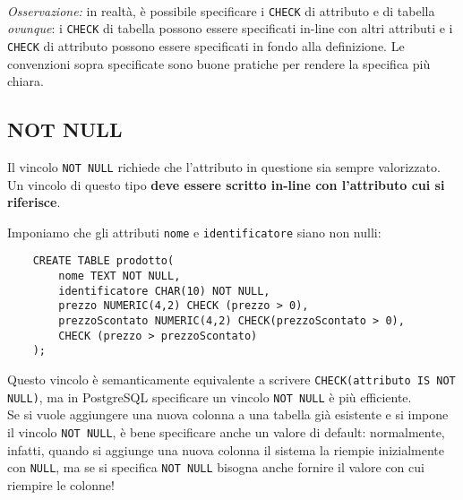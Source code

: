 \documentclass[12pt,a4paper]{book}
\begin{document}
	\paragraph{}\textit{Osservazione:} in realtà, è possibile specificare i \texttt{CHECK} di attributo e di tabella \textit{ovunque}: i \texttt{CHECK} di tabella possono essere specificati in-line con altri attributi e i \texttt{CHECK} di attributo possono essere specificati in fondo alla definizione. Le convenzioni sopra specificate sono buone pratiche per rendere la specifica più chiara.
	\subsection{NOT NULL}
	Il vincolo \texttt{NOT NULL} richiede che l'attributo in questione sia sempre valorizzato.\\Un vincolo di questo tipo \textbf{deve essere scritto in-line con l'attributo cui si riferisce}.
	\begin{tcolorbox}[enhanced jigsaw, breakable, title=Esempio, title filled]
	Imponiamo che gli attributi \texttt{nome} e \texttt{identificatore} siano non nulli:
	\begin{lstlisting}
	CREATE TABLE prodotto(
		nome TEXT NOT NULL,
		identificatore CHAR(10) NOT NULL,
		prezzo NUMERIC(4,2) CHECK (prezzo > 0),
		prezzoScontato NUMERIC(4,2) CHECK(prezzoScontato > 0),
		CHECK (prezzo > prezzoScontato)
	);
	\end{lstlisting}
	\end{tcolorbox}
	Questo vincolo è semanticamente equivalente a scrivere \texttt{CHECK(attributo IS NOT NULL)}, ma in PostgreSQL specificare un vincolo \texttt{NOT NULL} è più efficiente.\\Se si vuole aggiungere una nuova colonna a una tabella già esistente e si impone il vincolo \texttt{NOT NULL}, è bene specificare anche un valore di default: normalmente, infatti, quando si aggiunge una nuova colonna il sistema la riempie inizialmente con \texttt{NULL}, ma se si specifica \texttt{NOT NULL} bisogna anche fornire il valore con cui riempire le colonne!
\end{document}
